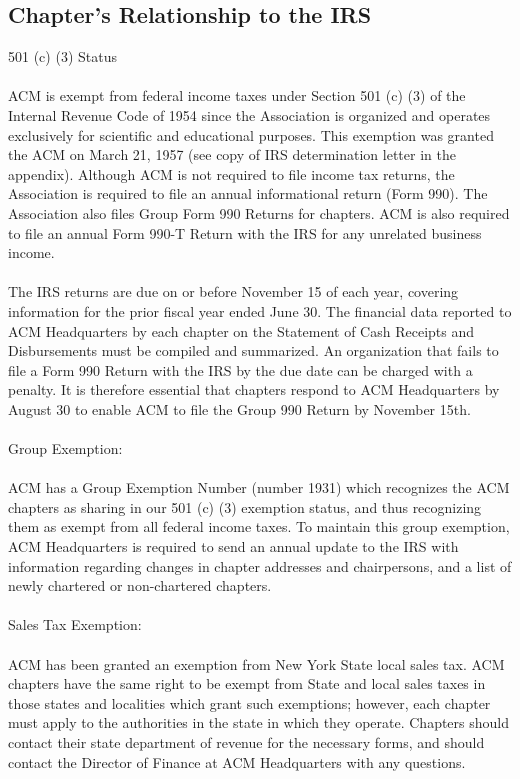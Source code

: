 \subsection{Chapter's Relationship to the IRS}
501 (c) (3) Status
\\
\\
ACM is exempt from federal income taxes under Section 501 (c) (3) of the Internal Revenue Code of 1954 since the Association is organized and operates exclusively for scientific and educational purposes. This exemption was granted the ACM on March 21, 1957 (see copy of IRS determination letter in the appendix). Although ACM is not required to file income tax returns, the Association is required to file an annual informational return (Form 990). The Association also files Group Form 990 Returns for chapters. ACM is also required to file an annual Form 990-T Return with the IRS for any unrelated business income.
\\
\\
The IRS returns are due on or before November 15 of each year, covering information for the prior fiscal year ended June 30. The financial data reported to ACM Headquarters by each chapter on the Statement of Cash Receipts and Disbursements must be compiled and summarized. An organization that fails to file a Form 990 Return with the IRS by the due date can be charged with a penalty. It is therefore essential that chapters respond to ACM Headquarters by August 30 to enable ACM to file the Group 990 Return by November 15th.
\\
\\
Group Exemption: 
\\
\\
ACM has a Group Exemption Number (number 1931) which recognizes the ACM chapters as sharing in our 501 (c) (3) exemption status, and thus recognizing them as exempt from all federal income taxes. To maintain this group exemption, ACM Headquarters is required to send an annual update to the IRS with information regarding changes in chapter addresses and chairpersons, and a list of newly chartered or non-chartered chapters.
\\
\\
Sales Tax Exemption: 
\\
\\
ACM has been granted an exemption from New York State local sales tax. ACM chapters have the same right to be exempt from State and local sales taxes in those states and localities which grant such exemptions; however, each chapter must apply to the authorities in the state in which they operate. Chapters should contact their state department of revenue for the necessary forms, and should contact the Director of Finance at ACM Headquarters with any questions.
